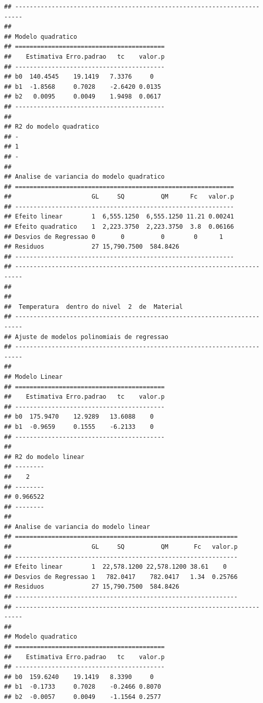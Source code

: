 \documentclass[
]{book}
\begin{document}
\begin{verbatim}
## ------------------------------------------------------------------------
## 
## Modelo quadratico
## =========================================
##    Estimativa Erro.padrao   tc    valor.p
## -----------------------------------------
## b0  140.4545    19.1419   7.3376     0   
## b1  -1.8568     0.7028    -2.6420 0.0135 
## b2   0.0095     0.0049    1.9498  0.0617 
## -----------------------------------------
## 
## R2 do modelo quadratico
## -
## 1
## -
## 
## Analise de variancia do modelo quadratico
## ============================================================
##                      GL     SQ          QM      Fc   valor.p
## ------------------------------------------------------------
## Efeito linear        1  6,555.1250  6,555.1250 11.21 0.00241
## Efeito quadratico    1  2,223.3750  2,223.3750  3.8  0.06166
## Desvios de Regressao 0       0          0        0      1   
## Residuos             27 15,790.7500  584.8426               
## ------------------------------------------------------------
## ------------------------------------------------------------------------
## 
## 
##  Temperatura  dentro do nivel  2  de  Material 
## ------------------------------------------------------------------------
## Ajuste de modelos polinomiais de regressao
## ------------------------------------------------------------------------
## 
## Modelo Linear
## =========================================
##    Estimativa Erro.padrao   tc    valor.p
## -----------------------------------------
## b0  175.9470    12.9289   13.6088    0   
## b1  -0.9659     0.1555    -6.2133    0   
## -----------------------------------------
## 
## R2 do modelo linear
## --------
##    2    
## --------
## 0.966522
## --------
## 
## Analise de variancia do modelo linear
## =============================================================
##                      GL     SQ          QM       Fc   valor.p
## -------------------------------------------------------------
## Efeito linear        1  22,578.1200 22,578.1200 38.61    0   
## Desvios de Regressao 1   782.0417    782.0417   1.34  0.25766
## Residuos             27 15,790.7500  584.8426                
## -------------------------------------------------------------
## ------------------------------------------------------------------------
## 
## Modelo quadratico
## =========================================
##    Estimativa Erro.padrao   tc    valor.p
## -----------------------------------------
## b0  159.6240    19.1419   8.3390     0   
## b1  -0.1733     0.7028    -0.2466 0.8070 
## b2  -0.0057     0.0049    -1.1564 0.2577 

\end{verbatim}
\end{document}
